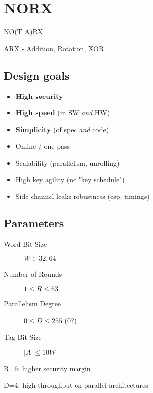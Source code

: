 \section{NORX}
\label{toc/caesar-norx}

NO(T A)RX

ARX - Addition, Rotation, XOR

\subsection{Design goals}

\begin{itemize}
  \item \textbf{High security}
  \item \textbf{High speed} (in SW \textit{and} HW)
  \item \textbf{Simplicity} (of spec \textit{and} code)
  \item Online / one-pass
  \item Scalability (parallelism, unrolling)
  \item High key agility (no "key schedule")
  \item Side-channel leaks robustness (esp. timings)
\end{itemize}

\subsection{Parameters}

\begin{description}
  \item[Word Bit Size] $W \in {32, 64}$
  \item[Number of Rounds] $1 \leq R \leq 63$
  \item[Parallelism Degree] $0 \leq D \leq 255$ (0?)
  \item[Tag Bit Size] $|A| \leq 10W$
\end{description}



R=6: higher security margin

D=4: high throughput on parallel architectures
